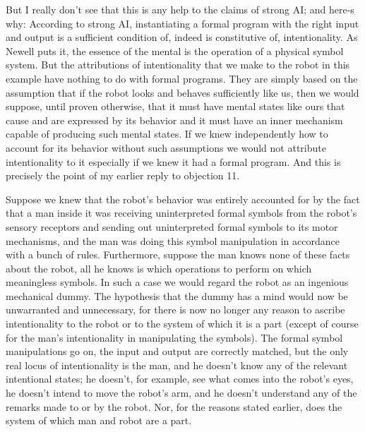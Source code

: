 But I really don't see that this is any help to the claims of strong AI; and here-s why: According to strong AI,
instantiating a formal program with the right input and output is a sufficient condition of, indeed is constitutive of,
intentionality. As Newell\autocite{Newell1} puts it, the essence of the mental is the operation of a physical symbol system.
But the attributions of intentionality that we make to the robot in this example have nothing to do with formal
programs. They are simply based on the assumption that if the robot looks and behaves sufficiently like us, then
we would suppose, until proven otherwise, that it must have mental states like ours that cause and are
expressed by its behavior and it must have an inner mechanism capable of producing such mental states. If we
knew independently how to account for its behavior without such assumptions we would not attribute
intentionality to it especially if we knew it had a formal program. And this is precisely the point of my earlier
reply to objection 11.

Suppose we knew that the robot's behavior was entirely accounted for by the fact that a man inside it was
receiving uninterpreted formal symbols from the robot's sensory receptors and sending out uninterpreted formal
symbols to its motor mechanisms, and the man was doing this symbol manipulation in accordance with a bunch
of rules. Furthermore, suppose the man knows none of these facts about the robot, all he knows is which
operations to perform on which meaningless symbols. In such a case we would regard the robot as an ingenious
mechanical dummy. The hypothesis that the dummy has a mind would now be unwarranted and unnecessary,
for there is now no longer any reason to ascribe intentionality to the robot or to the system of which it is a part
(except of course for the man's intentionality in manipulating the symbols). The formal symbol manipulations go
on, the input and output are correctly matched, but the only real locus of intentionality is the man, and he doesn't
know any of the relevant intentional states; he doesn't, for example, see what comes into the robot's eyes, he
doesn't intend to move the robot's arm, and he doesn't understand any of the remarks made to or by the robot.
Nor, for the reasons stated earlier, does the system of which man and robot are a part.

